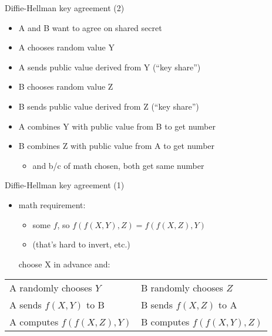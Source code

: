 \begin{frame}{Diffie-Hellman key agreement (2)}
\begin{itemize}
\item A and B want to agree on shared secret
\vspace{.5cm}
\item A chooses random value Y
\item A sends public value derived from Y (``key share'')
\item B chooses random value Z
\item B sends public value derived from Z (``key share'')
\item A combines Y with public value from B to get number
\item B combines Z with public value from A to get number
    \begin{itemize}
    \item and b/c of math chosen, both get same number
    \end{itemize}
\end{itemize}
\end{frame}

\begin{frame}{Diffie-Hellman key agreement (1)}
    \begin{itemize}
    \item math requirement:
        \begin{itemize}
        \item some $f$, so $f(f(X, Y), Z) = f(f(X, Z), Y)$
        \item (that's hard to invert, etc.)
        \end{itemize}
    choose X in advance and:
    \end{itemize}
\begin{tabular}{l|l}
A randomly chooses $Y$ & B randomly chooses $Z$ \\
A sends $f(X, Y)$ to B & B sends $f(X, Z)$ to A \\
A computes $f(f(X, Z), Y)$ & B computes $f(f(X, Y), Z)$ \\
\end{tabular}
\end{frame}

